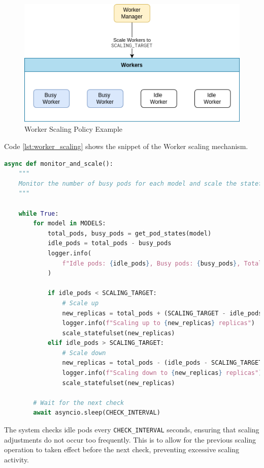 \begin{figure}[H]
  \centering
  \includegraphics[width=.8\textwidth]{figures/worker_scaling_policy.drawio.png}
  \caption{Worker Scaling Policy Example}
  \label{fig:worker_scaling_policy}
\end{figure}

Code \ref{lst:worker_scaling} shows the snippet of the Worker scaling mechanism.

\begin{lstlisting}[language=python, caption={Worker Scaling Policy}, label={lst:worker_scaling}]
async def monitor_and_scale():
    """
    Monitor the number of busy pods for each model and scale the statefulset up or down based on the number of idle pods.
    """

    while True:
        for model in MODELS:
            total_pods, busy_pods = get_pod_states(model)
            idle_pods = total_pods - busy_pods
            logger.info(
                f"Idle pods: {idle_pods}, Busy pods: {busy_pods}, Total pods: {total_pods}"
            )

            if idle_pods < SCALING_TARGET:
                # Scale up
                new_replicas = total_pods + (SCALING_TARGET - idle_pods)
                logger.info(f"Scaling up to {new_replicas} replicas")
                scale_statefulset(new_replicas)
            elif idle_pods > SCALING_TARGET:
                # Scale down
                new_replicas = total_pods - (idle_pods - SCALING_TARGET)
                logger.info(f"Scaling down to {new_replicas} replicas")
                scale_statefulset(new_replicas)

        # Wait for the next check
        await asyncio.sleep(CHECK_INTERVAL)
\end{lstlisting}

The system checks idle pods every \texttt{CHECK\_INTERVAL} seconds, ensuring that scaling adjustments do not occur too frequently. This is to allow for the previous scaling operation to taken effect before the next check, preventing excessive scaling activity.

